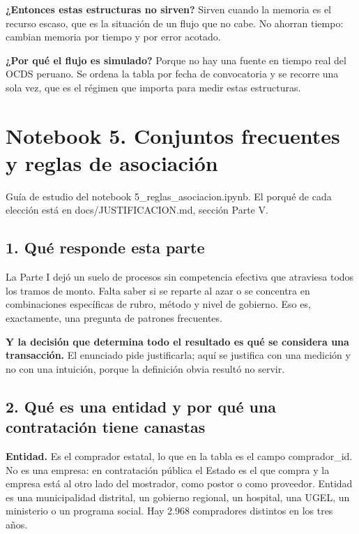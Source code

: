 \documentclass[11pt]{article}
\begin{document}
\textbf{¿Entonces estas estructuras no sirven?} Sirven cuando la memoria es el recurso escaso, que es la situación de un flujo que no cabe. No ahorran tiempo: cambian memoria por tiempo y por error acotado.

\textbf{¿Por qué el flujo es simulado?} Porque no hay una fuente en tiempo real del OCDS peruano. Se ordena la tabla por fecha de convocatoria y se recorre una sola vez, que es el régimen que importa para medir estas estructuras.


\clearpage
{}
\section*{Notebook 5. Conjuntos frecuentes y reglas de asociación}
Guía de estudio del notebook 5\_\allowbreak{}reglas\_\allowbreak{}asociacion.ipynb. El porqué de cada elección está en docs/JUSTIFICACION.md, sección Parte V.

\subsection*{1. Qué responde esta parte}
La Parte I dejó un suelo de procesos sin competencia efectiva que atraviesa todos los tramos de monto. Falta saber si se reparte al azar o se concentra en combinaciones específicas de rubro, método y nivel de gobierno. Eso es, exactamente, una pregunta de patrones frecuentes.

\textbf{Y la decisión que determina todo el resultado es qué se considera una transacción.} El enunciado pide justificarla; aquí se justifica con una medición y no con una intuición, porque la definición obvia resultó no servir.

\subsection*{2. Qué es una entidad y por qué una contratación tiene canastas}
\textbf{Entidad.} Es el comprador estatal, lo que en la tabla es el campo comprador\_\allowbreak{}id. No es una empresa: en contratación pública el Estado es el que compra y la empresa está al otro lado del mostrador, como postor o como proveedor. Entidad es una municipalidad distrital, un gobierno regional, un hospital, una UGEL, un ministerio o un programa social. Hay 2.968 compradores distintos en los tres años.
\end{document}
